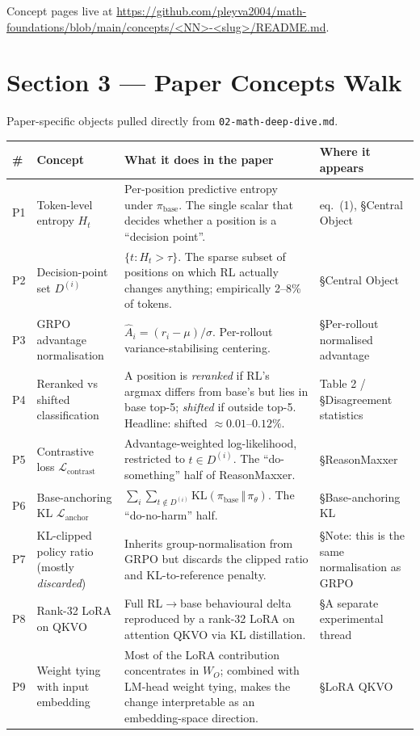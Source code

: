 \documentclass[11pt]{article}
\begin{document}
Concept pages live at \url{https://github.com/pleyva2004/math-foundations/blob/main/concepts/<NN>-<slug>/README.md}.

\section*{Section 3 --- Paper Concepts Walk}

Paper-specific objects pulled directly from \texttt{02-math-deep-dive.md}.

\begin{longtable}{@{}p{0.6cm}p{4.5cm}p{6.5cm}p{4cm}@{}}
\toprule
\# & Concept & What it does in the paper & Where it appears \\
\midrule
\endhead
P1 & Token-level entropy $H_t$ & Per-position predictive entropy under $\pi_{\text{base}}$. The single scalar that decides whether a position is a ``decision point''. & eq.\ (1), \S Central Object \\
P2 & Decision-point set $D^{(i)}$ & $\{t : H_t > \tau\}$. The sparse subset of positions on which RL actually changes anything; empirically 2--8\% of tokens. & \S Central Object \\
P3 & GRPO advantage normalisation & $\hat A_i = (r_i - \mu)/\sigma$. Per-rollout variance-stabilising centering. & \S Per-rollout normalised advantage \\
P4 & Reranked vs shifted classification & A position is \emph{reranked} if RL's argmax differs from base's but lies in base top-5; \emph{shifted} if outside top-5. Headline: shifted $\approx 0.01$--$0.12\%$. & Table 2 / \S Disagreement statistics \\
P5 & Contrastive loss $\mathcal{L}_{\text{contrast}}$ & Advantage-weighted log-likelihood, restricted to $t \in D^{(i)}$. The ``do-something'' half of ReasonMaxxer. & \S ReasonMaxxer \\
P6 & Base-anchoring KL $\mathcal{L}_{\text{anchor}}$ & $\sum_i \sum_{t \notin D^{(i)}} \mathrm{KL}(\pi_{\text{base}} \,\Vert\, \pi_\theta)$. The ``do-no-harm'' half. & \S Base-anchoring KL \\
P7 & KL-clipped policy ratio (mostly \emph{discarded}) & Inherits group-normalisation from GRPO but discards the clipped ratio and KL-to-reference penalty. & \S Note: this is the same normalisation as GRPO \\
P8 & Rank-32 LoRA on QKVO & Full RL$\rightarrow$base behavioural delta reproduced by a rank-32 LoRA on attention QKVO via KL distillation. & \S A separate experimental thread \\
P9 & Weight tying with input embedding & Most of the LoRA contribution concentrates in $W_O$; combined with LM-head weight tying, makes the change interpretable as an embedding-space direction. & \S LoRA QKVO \\
\bottomrule
\end{longtable}
\end{document}
